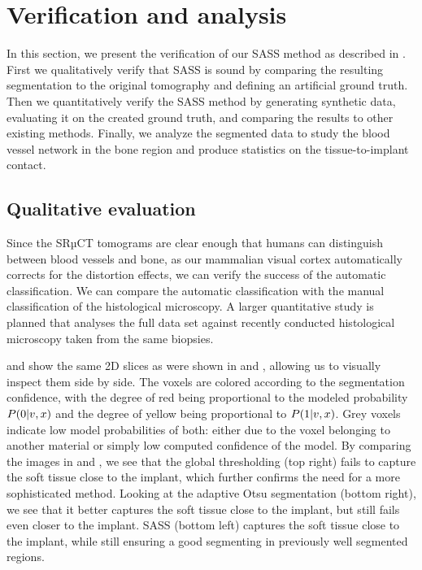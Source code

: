 \section{Verification and analysis}
\label{sec:verification}
In this section, we present the verification of our SASS method as described in
. First we qualitatively verify that SASS is sound by
comparing the resulting segmentation to the original tomography and defining an
artificial ground truth. Then we quantitatively verify the SASS method by
generating synthetic data, evaluating it on the created ground truth, and
comparing the results to other existing methods. Finally, we analyze the
segmented data to study the blood vessel network in the bone region and produce
statistics on the tissue-to-implant contact.

\subsection{Qualitative evaluation}

Since the SRµCT tomograms are clear enough that humans can distinguish between
blood vessels and bone, as our mammalian visual cortex automatically corrects
for the distortion effects, we can verify the success of the automatic
classification. We can compare the automatic classification with the manual
classification of the histological microscopy. A larger quantitative study is
planned that analyses the full data set against recently conducted histological
microscopy taken from the same biopsies.

 and  show the
same 2D slices as were shown in  and ,
allowing us to visually inspect them side by side. The voxels are colored
according to the segmentation confidence, with the degree of red being
proportional to the modeled probability $P\!\left(0\middle\vert v,x\right)$ and the degree of
yellow being proportional to $P\!\left(1\middle\vert v,x\right)$. Grey voxels indicate low model
probabilities of both: either due to the voxel belonging to another material or
simply low computed confidence of the model.  By comparing the images in
 and , we see
that the global thresholding (top right) fails to capture the soft tissue
close to the implant, which further confirms the need for a more sophisticated
method. Looking at the adaptive Otsu segmentation (bottom right), we see that it better
captures the soft tissue close to the implant, but still fails even closer to
the implant. SASS (bottom left) captures the soft tissue close to the
implant, while still ensuring a good segmenting in previously well segmented
regions.

